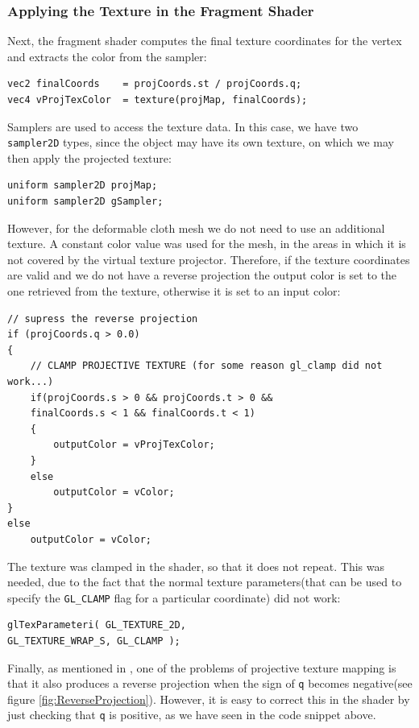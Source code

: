 \documentclass[]{article}
\begin{document}
\subsubsection{Applying the Texture in the Fragment Shader}

Next, the fragment shader computes the final texture coordinates for the vertex and extracts the color from the sampler:
\begin{verbatim}
vec2 finalCoords	= projCoords.st / projCoords.q;
vec4 vProjTexColor  = texture(projMap, finalCoords);
\end{verbatim}

Samplers are used to access the texture data. In this case, we have two \verb|sampler2D| types, since the object may have its own texture, on which we may then apply the projected texture:
\begin{verbatim}
uniform sampler2D projMap;
uniform sampler2D gSampler;
\end{verbatim}

However, for the deformable cloth mesh we do not need to use an additional texture. A constant color value was used for the mesh, in the areas in which it is not covered by the virtual texture projector. Therefore, if the texture coordinates are valid and we do not have a reverse projection the output color is set to the one retrieved from the texture, otherwise it is set to an input color:
\begin{verbatim}
// supress the reverse projection
if (projCoords.q > 0.0)
{
    // CLAMP PROJECTIVE TEXTURE (for some reason gl_clamp did not work...)
    if(projCoords.s > 0 && projCoords.t > 0 && 
    finalCoords.s < 1 && finalCoords.t < 1)
    {
	    outputColor = vProjTexColor;
    }
    else
        outputColor = vColor;
}
else
    outputColor = vColor;
\end{verbatim}

The texture was clamped in the shader, so that it does not repeat. This was needed, due to the fact that the normal texture parameters(that can be used to specify the \verb|GL_CLAMP| flag for a particular coordinate) did not work:
\begin{verbatim}
glTexParameteri( GL_TEXTURE_2D, 
GL_TEXTURE_WRAP_S, GL_CLAMP ); 
\end{verbatim}

Finally, as mentioned in \cite{cassNvidia}, one of the problems of projective texture mapping is that it also produces a reverse projection when the sign of \verb|q| becomes negative(see figure \ref{fig:ReverseProjection}). However, it is easy to correct this in the shader by just checking that \verb|q| is positive, as we have seen in the code snippet above.
\end{document}
